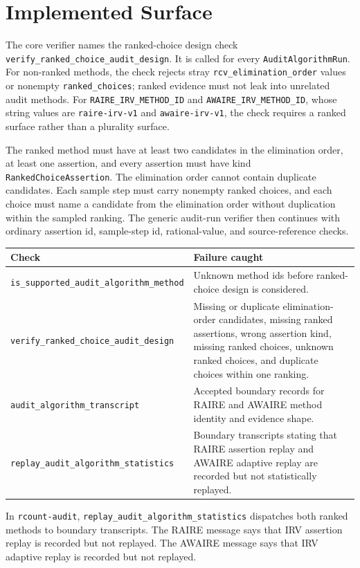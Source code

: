\section{Implemented Surface}

The core verifier names the ranked-choice design check
\texttt{verify\_ranked\_choice\_audit\_design}. It is called for every
\texttt{AuditAlgorithmRun}. For non-ranked methods, the check rejects stray
\texttt{rcv\_elimination\_order} values or nonempty
\texttt{ranked\_choices}; ranked evidence must not leak into unrelated audit
methods. For \texttt{RAIRE\_IRV\_METHOD\_ID} and
\texttt{AWAIRE\_IRV\_METHOD\_ID}, whose string values are
\texttt{raire-irv-v1} and \texttt{awaire-irv-v1}, the check requires a ranked
surface rather than a plurality surface.

The ranked method must have at least two candidates in the elimination order,
at least one assertion, and every assertion must have kind
\texttt{RankedChoiceAssertion}. The elimination order cannot contain duplicate
candidates. Each sample step must carry nonempty ranked choices, and each choice
must name a candidate from the elimination order without duplication within the
sampled ranking. The generic audit-run verifier then continues with ordinary
assertion id, sample-step id, rational-value, and source-reference checks.

\begin{center}
\small
\begin{tabularx}{\textwidth}{lX}
\toprule
Check & Failure caught \\
\midrule
\texttt{is\_supported\_audit\_algorithm\_method} & Unknown method ids before ranked-choice design is considered. \\
\texttt{verify\_ranked\_choice\_audit\_design} & Missing or duplicate elimination-order candidates, missing ranked assertions, wrong assertion kind, missing ranked choices, unknown ranked choices, and duplicate choices within one ranking. \\
\texttt{audit\_algorithm\_transcript} & Accepted boundary records for RAIRE and AWAIRE method identity and evidence shape. \\
\texttt{replay\_audit\_algorithm\_statistics} & Boundary transcripts stating that RAIRE assertion replay and AWAIRE adaptive replay are recorded but not statistically replayed. \\
\bottomrule
\end{tabularx}
\end{center}

In \texttt{rcount-audit}, \texttt{replay\_audit\_algorithm\_statistics}
dispatches both ranked methods to boundary transcripts. The RAIRE message says
that IRV assertion replay is recorded but not replayed. The AWAIRE message says
that IRV adaptive replay is recorded but not replayed.
